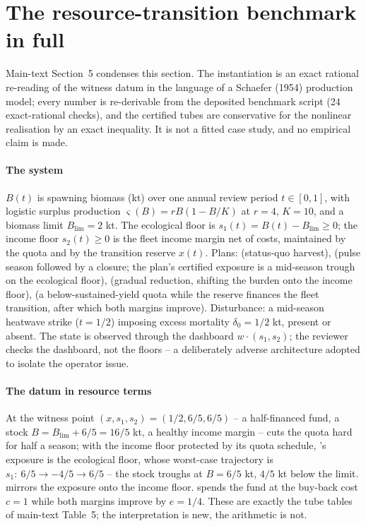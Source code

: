 \section{The resource-transition benchmark in full}\label{si:benchmark}

Main-text Section~5 condenses this section. The instantiation is an exact rational re-reading of the witness datum in the language of a Schaefer (1954) production model; every number is re-derivable from the deposited benchmark script (24 exact-rational checks), and the certified tubes are conservative for the nonlinear realisation by an exact inequality. It is not a fitted case study, and no empirical claim is made.

\paragraph{The system} $B(t)$ is spawning biomass (kt) over one annual review period $t\in[0,1]$, with logistic surplus production $\varsigma(B)=rB(1-B/K)$ at $r=4$, $K=10$, and a biomass limit $B_{\mathrm{lim}}=2$ kt. The ecological floor is $s_1(t)=B(t)-B_{\mathrm{lim}}\ge0$; the income floor $s_2(t)\ge0$ is the fleet income margin net of costs, maintained by the quota and by the transition reserve $x(t)$. Plans:  (status-quo harvest),  (pulse season followed by a closure; the plan's certified exposure is a mid-season trough on the ecological floor),  (gradual reduction, shifting the burden onto the income floor),  (a below-sustained-yield quota while the reserve finances the fleet transition, after which both margins improve). Disturbance: a mid-season heatwave strike ($t=1/2$) imposing excess mortality $\delta_0=1/2$ kt, present or absent. The state is observed through the dashboard $w\cdot(s_1,s_2)$; the reviewer checks the dashboard, not the floors -- a deliberately adverse architecture adopted to isolate the operator issue.

\paragraph{The datum in resource terms} At the witness point $(x,s_1,s_2)=(1/2,6/5,6/5)$ -- a half-financed fund, a stock $B=B_{\mathrm{lim}}+6/5=16/5$ kt, a healthy income margin --  cuts the quota hard for half a season; with the income floor protected by its quota schedule, 's exposure is the ecological floor, whose worst-case trajectory is $s_1:\ 6/5\to-4/5\to6/5$ -- the stock troughs at $B=6/5$ kt, $4/5$ kt below the limit.  mirrors the exposure onto the income floor.  spends the fund at the buy-back cost $c=1$ while both margins improve by $e=1/4$. These are exactly the tube tables of main-text Table~5; the interpretation is new, the arithmetic is not.

